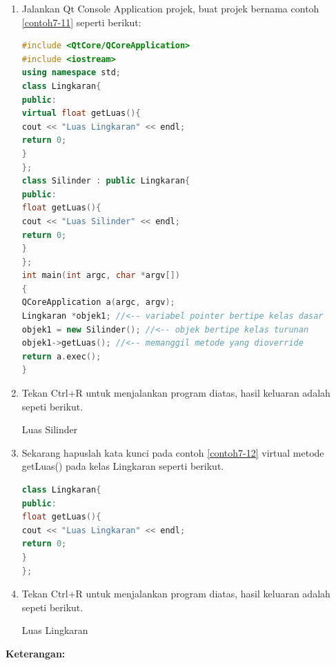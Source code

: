 \begin{enumerate}

\item
  Jalankan Qt Console Application projek, buat projek bernama contoh \ref{contoh7-11}
  seperti berikut:

\begin{lstlisting}[language=c++, caption=Metode virtual dan non virtual, label=contoh7-11]
#include <QtCore/QCoreApplication>
#include <iostream>
using namespace std;
class Lingkaran{
public:
virtual float getLuas(){
cout << "Luas Lingkaran" << endl;
return 0;
}
};
class Silinder : public Lingkaran{
public:
float getLuas(){
cout << "Luas Silinder" << endl;
return 0;
}
};
int main(int argc, char *argv[])
{
QCoreApplication a(argc, argv);
Lingkaran *objek1; //<-- variabel pointer bertipe kelas dasar
objek1 = new Silinder(); //<-- objek bertipe kelas turunan
objek1->getLuas(); //<-- memanggil metode yang dioverride
return a.exec();
}
\end{lstlisting}
\item
  Tekan Ctrl+R untuk menjalankan program diatas, hasil keluaran adalah
  sepeti berikut.

\begin{lcverbatim}
Luas Silinder
\end{lcverbatim} 
\item
  Sekarang hapuslah kata kunci pada contoh \ref{contoh7-12} virtual metode getLuas() pada kelas
  Lingkaran seperti berikut.

\begin{lstlisting}[language=c++, caption=Menghapus methode getluas, label=contoh7-12]
class Lingkaran{
public:
float getLuas(){
cout << "Luas Lingkaran" << endl;
return 0;
}
};
\end{lstlisting}
\item
  Tekan Ctrl+R untuk menjalankan program diatas, hasil keluaran adalah
  sepeti berikut.


\begin{lcverbatim}
Luas Lingkaran
\end{lcverbatim} 
\end{enumerate}
\textbf{Keterangan:}

